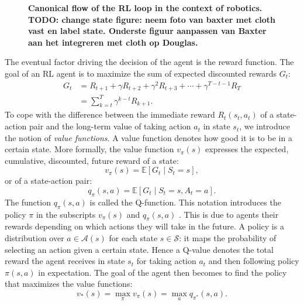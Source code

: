 \documentclass[\home/main.tex]{subfiles}
\begin{document}
\begin{figure}[htb]
	\centering
	
	\caption{\textbf{Canonical flow of the RL loop in the context of robotics. TODO: change state figure: neem foto van baxter met cloth vast en label state. Onderste figuur aanpassen van Baxter aan het integreren met cloth op Douglas.}}
	\label{fig:RL_loop_robotics}
\end{figure}

The eventual factor driving the decision of the agent is the reward function. The goal of an RL agent is to maximize the sum of expected discounted rewards $G_t$:
\begin{equation}
	\begin{split}
		G_{t} & =R_{t+1}+\gamma R_{t+2}+\gamma^{2} R_{t+3}+\cdots+\gamma^{T-t-1} R_{T} \\
		&		=\sum_{k=t}^{T} \gamma^{k-t} R_{k+1}.
	\end{split}
\end{equation}
To cope with the difference between the immediate reward $R_t(s_t, a_t)$ of a state-action pair and the long-term value of taking action $a_t$ in state $s_t$, we introduce the notion of \emph{value functions}. A value function denotes how good it is to be in a certain state. More formally, the value function $v_{\pi}(s)$ expresses the expected, cumulative, discounted, future reward of a state:
\begin{equation} \label{eq:value_function}
	v_{\pi}(s)=\mathbb{E}\left[G_{t} \mid S_{t}=s\right],
\end{equation}
or of a state-action pair:
\begin{equation}
	q_{\pi}(s, a)=\mathbb{E}\left[G_{t} \mid S_{t}=s, A_{t}=a\right].
\end{equation}
The function $q_{\pi}(s, a)$ is called the Q-function. This notation introduces the policy $\pi$ in the subscripts $v_{\pi}(s)$ and $q_{\pi}(s, a)$ . This is due to agents their rewards depending on which actions they will take in the future. A policy is a distribution over $a \in \mathcal{A}(s)$ for each state $s \in \mathcal{S}$: it maps the probability of selecting an action given a certain state. Hence a Q-value denotes the total reward the agent receives in state $s_t$ for taking action $a_t$ and then following policy $\pi(s,a)$ in expectation. The goal of the agent then becomes to find the policy that maximizes the value functions:
\begin{equation}
	v_{*}(s)=\max _{\pi} v_{\pi}(s)=\max _{a} q_{\pi^{*}}(s, a).
\end{equation}
\end{document}
